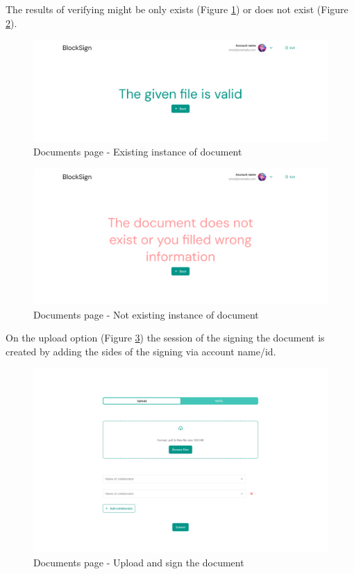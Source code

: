 The results of verifying might be only exists (Figure \ref{documents-exists}) or does not exist (Figure \ref{documents-noinstance}).


\begin{figure}[H]
    \centering
    \includegraphics[width=18cm]{"images/figmaUI/success-crop.png"}
    \caption{Documents page - Existing instance of document}
    \label{documents-exists}
\end{figure}


\begin{figure}[H]
    \centering
    \includegraphics[width=18cm]{"images/figmaUI/unsuccess-crop.png"}
    \caption{Documents page - Not existing instance of document}
    \label{documents-noinstance}
\end{figure}


On the upload option (Figure \ref{documentspage2}) the session of the signing the document is created by adding the sides of the signing via account name/id. 


\begin{figure}[H]
    \centering
    \includegraphics[width=18cm]{"images/figmaUI/documentspage2-crop.png"}
    \caption{Documents page - Upload and sign the document}
    \label{documentspage2}
\end{figure}

